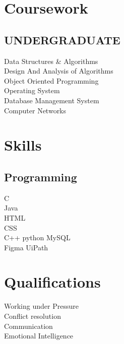 \documentclass[]{deedy-resume-openfont}
\begin{document}
\begin{minipage}[t]{0.33\textwidth}
\section{Coursework}
\subsection{UNDERGRADUATE}
Data Structures & Algorithms \\
Design And Analysis of Algorithms \\
Object Oriented Programming \\
Operating System \\
Database Management System \\
Computer Networks \\

\sectionsep
\vspace{10pt} %


\section{Skills}
\subsection{Programming}
\textbullet{} C \\
\textbullet{} Java \\
\textbullet{} HTML\\
\textbullet{} CSS\\


\textbullet{}C++ 
 \textbullet{} python
\textbullet{} MySQL \\

\textbullet{} Figma
 \textbullet{} UiPath



\sectionsep
\vspace{10pt} %

\section{Qualifications}

\textbullet{}  Working under Pressure\\
\textbullet{}  Conflict resolution\\
\textbullet{} Communication\\
\textbullet{}  Emotional Intelligence\\


\sectionsep






    





\sectionsep


%
%

\end{minipage} 
\end{document}
